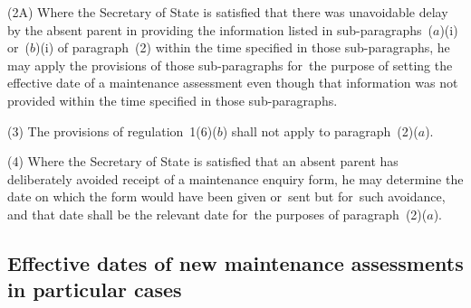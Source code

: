 \documentclass[a4paper,12pt]{article}
\begin{document}
(2A) Where 
the Secretary of State  %
is satisfied that there was unavoidable delay by the absent parent in providing the information listed in sub-paragraphs~($a$)(i) or~($b$)(i) of paragraph~(2) within the time specified in those sub-paragraphs, he may apply the provisions of those sub-paragraphs for~the purpose of setting the effective date of a maintenance assessment even though that information was not provided within the time specified in those sub-paragraphs.

\begin{sloppypar}
(3) The provisions of regulation~1(6)($b$) shall not apply to paragraph~(2)($a$).
\end{sloppypar}

(4) Where 
the Secretary of State  %
is satisfied that an absent parent has deliberately avoided receipt of a maintenance enquiry form, he may determine the date on which the form would have been given or~sent but for~such avoidance, and that date shall be the relevant date for~the purposes of paragraph~(2)($a$).


\subsection[30A. Effective dates of new maintenance assessments in particular cases]{Effective dates of new maintenance assessments in particular cases}
\end{document}
